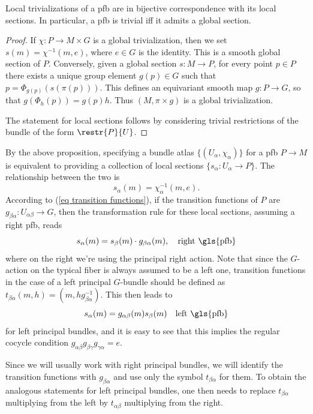 \begin{prop}[{{\cite[Prop.~1.1.6]{RS2}}}]\label{prop 1.1.6 RS2}
    Local trivializations of a \gls{pfb} are in bijective correspondence with its local sections. In particular, a \gls{pfb} is trivial iff it admits a global section.
\end{prop}
\begin{proof}
    If $\chi:P\to M\times G$ is a global trivialization, then we set $s(m)=\chi^{-1}(m,e)$, where $e\in G$ is the identity. This is a smooth global section of $P$. Conversely, given a global section $s:M\to P$, for every point $p\in P$ there exists a unique group element $g(p)\in G$ such that $p=\Phi_{g(p)}(s(\pi(p)))$. This defines an equivariant smooth map $g:P\to G$, so that $g(\Phi_h(p))=g(p)h$. Thus $(M,\pi\times g)$ is a global trivialization.

    The statement for local sections follows by considering trivial restrictions of the bundle of the form $\restr{P}{U}$.
\end{proof}


\begin{rem}
    By the above proposition, specifying a bundle atlas $\{(U_\alpha,\chi_\alpha)\}$ for a \gls{pfb} $P\to M$ is equivalent to providing a collection of local sections $\{s_\alpha:U_\alpha\to P\}$. The relationship between the two is 
    \[s_\alpha(m)=\chi_\alpha^{-1}(m,e).\]
    According to (\ref{eq transition functions}), if the transition functions of $P$ are $g_{\beta\alpha}:U_{\alpha\beta}\to G$, then the transformation rule for these local sections, assuming a right \gls{pfb}, reads 
    \[s_\alpha(m)=s_\beta(m)\cdot g_{\beta\alpha}(m),\quad \text{right \gls{pfb}}\label{eq transf rule for sections}\]
    where on the right we're using the principal right action. Note that since the $G$-action on the typical fiber is always assumed to be a left one, transition functions in the case of a left principal $G$-bundle should be defined as $t_{\beta\alpha}(m,h)=(m,hg_{\beta\alpha}^{-1})$. This then leads to 
    \[s_\alpha(m)=g_{\alpha\beta}(m) s_\beta(m) \quad \text{left \gls{pfb}}\]
    for left principal bundles, and it is easy to see that this implies the regular cocycle condition $g_{\alpha\beta}g_{\beta\gamma}g_{\gamma\alpha}=e$.

    Since we will usually work with right principal bundles, we will identify the transition functions with $g_{\beta\alpha}$ and use only the symbol $t_{\beta\alpha}$ for them. To obtain the analogous statements for left principal bundles, one then needs to replace $t_{\beta\alpha}$ multiplying from the left by $t_{\alpha\beta}$ multiplying from the right.
\end{rem}

